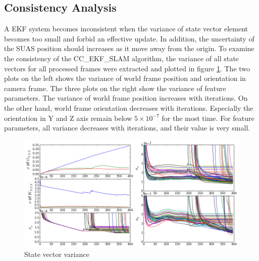 \subsection{Consistency Analysis}
A EKF system becomes inconsistent when the variance of state vector
element becomes too small and forbid an effective update. In addition,
the uncertainty of the SUAS position should increases as it move away
from the origin. To examine the consistency of the CC\_EKF\_SLAM
algorithm, the variance of all state vectors for all processed frames
were extracted and plotted in figure \ref{fltfig:3}. The two plots on
the left shows the variance of world frame position and orientation in
camera frame. The three plots on the right show the variance of
feature parameters. The variance of world frame position increases
with iterations. On the other hand, world frame orientation decreases
with iterations. Especially the orientation in Y and Z axis remain
below $5\times10^{-7}$ for the most time. For feature parameters, all variance
decreases with iterations, and their value is very small. 
\begin{figure}[h]
\centering
\includegraphics[width=12cm, keepaspectratio=true]
{./Figures/fltfig/cut1/Figure40.png}
\caption{State vector variance}
\label{fltfig:3}
\end{figure}

